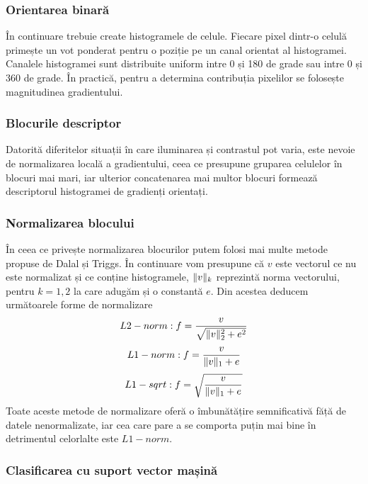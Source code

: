 \subsubsection {Orientarea binară}

În continuare trebuie create histogramele de celule. Fiecare pixel dintr-o celulă primește un vot ponderat pentru o poziție pe un canal orientat al histogramei. Canalele histogramei sunt distribuite uniform intre 0 și 180 de grade sau intre 0 și 360 de grade. În practică, pentru a determina contribuția pixelilor se folosește magnitudinea gradientului.

\subsubsection {Blocurile descriptor}

Datorită diferitelor situații în care iluminarea și contrastul pot varia, este nevoie de normalizarea locală a gradientului, ceea ce presupune gruparea celulelor în blocuri mai mari, iar ulterior concatenarea mai multor blocuri formează descriptorul histogramei de gradienți orientați.

\subsubsection {Normalizarea blocului}

În ceea ce privește normalizarea blocurilor putem folosi mai multe metode propuse de Dalal și Triggs. În continuare vom presupune că $v$ este vectorul ce nu este normalizat și ce conține histogramele, $\lVert v\rVert_k$ reprezintă norma vectorului, pentru $k = 1,2$ la care adugăm și o constantă $e$. Din acestea deducem următoarele forme de normalizare
\begin{align}	
	L2-norm: f = \frac{v}{\sqrt{\lVert v\rVert_2^2 + e^2}}
\end{align}
\begin{align}	
	L1-norm: f = \frac{v}{\lVert v\rVert_1 + e}
\end{align}
\begin{align}	
	L1-sqrt: f = \sqrt{\frac{v}{\lVert v\rVert_1 + e}}
\end{align}
Toate aceste metode de normalizare oferă o îmbunătățire semnificativă făță de datele nenormalizate, iar cea care pare a se comporta puțin mai bine în detrimentul celorlalte este $L1-norm$.

\subsubsection {Clasificarea cu suport vector mașină}

